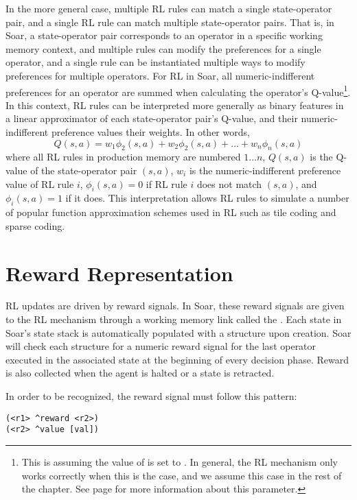 In the more general case, multiple RL rules can match a single state-operator pair, and a single RL rule can match multiple state-operator pairs.
That is, in Soar, a state-operator pair corresponds to an operator in a specific working memory context, and multiple rules can modify the preferences for a single operator, and a single rule can be instantiated multiple ways to modify preferences for multiple operators.
For RL in Soar, all numeric-indifferent preferences for an operator are summed when calculating the operator's Q-value\footnote{
This is assuming the value of  is set to .
In general, the RL mechanism only works correctly when this is the case, and we assume this case in the rest of the chapter.
See page \pageref{decide-numeric-indifferent-mode} for more information about this parameter.}.
In this context, RL rules can be interpreted more generally as binary features in a linear approximator of each state-operator pair's Q-value, and their numeric-indifferent preference values their weights.
In other words,
$$Q(s, a) = w_1 \phi_2 (s, a) + w_2 \phi_2 (s, a) + \ldots + w_n \phi_n (s, a)$$
where all RL rules in production memory are numbered $1 \dots n$, $Q(s, a)$ is the Q-value of the state-operator pair $(s, a)$, $w_i$ is the numeric-indifferent preference value of RL rule $i$, $\phi_i (s, a) = 0$ if RL rule $i$ does not match $(s, a)$, and $\phi_i (s, a) = 1$ if it does.
This interpretation allows RL rules to simulate a number of popular function approximation schemes used in RL such as tile coding and sparse coding.

\section{Reward Representation}
\label{RL-reward}

RL updates are driven by reward signals.
In Soar, these reward signals are given to the RL mechanism through a working memory link called the .
Each state in Soar's state stack is automatically populated with a  structure upon creation.
Soar will check each structure for a numeric reward signal for the last operator executed in the associated state at the beginning of every decision phase.
Reward is also collected when the agent is halted or a state is retracted.

In order to be recognized, the reward signal must follow this pattern:

\begin{verbatim}
(<r1> ^reward <r2>)
(<r2> ^value [val])
\end{verbatim}

